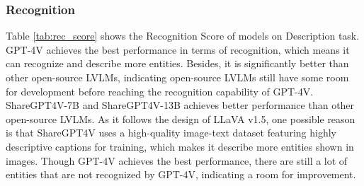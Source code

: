 \subsubsection{Recognition}

Table \ref{tab:rec_score} shows the Recognition Score of models on Description task.
GPT-4V achieves the best performance in terms of recognition, which means it can recognize and describe more entities.
Besides, it is significantly better than other open-source LVLMs, indicating open-source LVLMs still have some room for development before reaching the recognition capability of GPT-4V.
ShareGPT4V-7B and ShareGPT4V-13B achieves better performance than other open-source LVLMs.
As it follows the design of LLaVA v1.5, one possible reason is that ShareGPT4V uses a high-quality image-text dataset featuring highly descriptive captions for training, which makes it describe more entities shown in images. 
Though GPT-4V achieves the best performance, there are still a lot of entities that are not recognized by GPT-4V, indicating a room for improvement.


